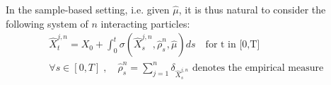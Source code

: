 In the sample-based setting, i.e. given $\widehat{\mu}$, it is thus natural to consider the following system of $n$ interacting particles:
\begin{align}\label{eq:sample_based_process}
&\widehat{X}_t^{j,n}=X_{0}+\int_{0}^t \sigma(\widehat{X}_s^{j,n}, \widehat{\rho}_s^n, \widehat{\mu})ds \quad \text{for t in [0,T]}\\
&\forall s \in [0,T]\;,\quad \widehat{\rho}_s^n=\sum_{j=1}^{n} \delta_{\widehat{X}_s^{j,n}} \text{ denotes the empirical measure } 
\end{align}





